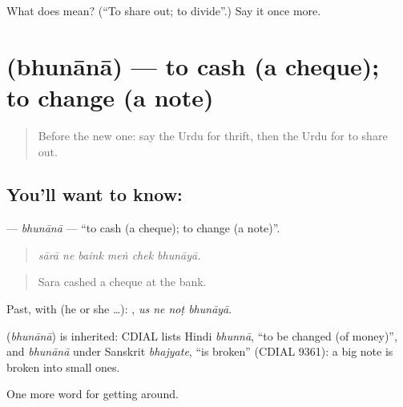 \begin{tcolorbox}[breakable,colback=teal!4,colframe=teal!35!black,title={Before you move on}]
What does  mean? (\textquotedblleft{}To share out; to divide\textquotedblright{}.) Say it once more.
\end{tcolorbox}
\section[\texorpdfstring{\ur{بھنانا} (bhunānā)}{بھنانا (bhunānā)}]{ (bhunānā) — to cash (a cheque); to change (a note)}

\label{lesson:UR-C420-bhunana}



\begin{quote}
Before the new one: say the Urdu for thrift, then the Urdu for to share out.
\end{quote}

\subsection*{You'll want to know: }
\textbf{} — \emph{bhunānā} — \textquotedblleft{}to cash (a cheque); to change (a note)\textquotedblright{}.

\begin{quote}
     
\end{quote}

\begin{quote}
\emph{sārā ne baink meṅ chek bhunāyā.}
\end{quote}

\begin{quote}
Sara cashed a cheque at the bank.
\end{quote}

Past, with  (he or she …):    , \emph{us ne noṭ bhunāyā}.

\begin{cousinweb}
\textbf{} (\emph{bhunānā}) is inherited: CDIAL lists Hindi \emph{bhunnā}, \textquotedblleft{}to be changed (of money)\textquotedblright{}, and \emph{bhunānā} under Sanskrit \emph{bhajyate}, \textquotedblleft{}is broken\textquotedblright{} (CDIAL 9361): a big note is broken into small ones.
\end{cousinweb}

\begin{grammarlens}[title={What you've built}]
One more word for getting around.
\end{grammarlens}

